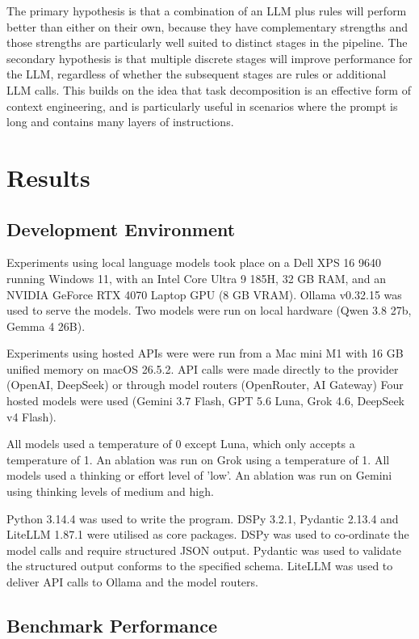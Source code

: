 \documentclass[conference]{IEEEtran}
\begin{document}
The primary hypothesis is that a combination of an LLM
plus rules will perform better than either on their own, 
because they have complementary strengths and those 
strengths are particularly well suited to distinct stages in
the pipeline. The secondary hypothesis is that multiple 
discrete stages will improve performance for the LLM,
regardless of whether the subsequent stages are rules or 
additional LLM calls. This builds on the idea that task 
decomposition is an effective form of context engineering, 
and is particularly useful in scenarios where the prompt 
is long and contains many layers of instructions. 

\section{Results}
\subsection{Development Environment}

Experiments using local language models took place on a 
Dell XPS 16 9640 running Windows 11, with an Intel Core 
Ultra 9 185H, 32 GB RAM, and an NVIDIA GeForce RTX 
4070 Laptop GPU (8 GB VRAM). Ollama v0.32.15 was 
used to serve the models. Two models were run on local 
hardware (Qwen 3.8 27b, Gemma 4 26B). 

Experiments using hosted APIs were were run from a Mac 
mini M1 with 16 GB unified memory on macOS 26.5.2. API
calls were made directly to the provider (OpenAI, DeepSeek) 
or through model routers (OpenRouter, AI Gateway) Four 
hosted models were used (Gemini 3.7 Flash, GPT 5.6 Luna, 
Grok 4.6, DeepSeek v4 Flash). 

All models used a temperature of 0 except Luna, which only 
accepts a temperature of 1. An ablation was run on Grok 
using a temperature of 1. All models used a thinking or effort 
level of 'low'. An ablation was run on Gemini using thinking
levels of medium and high. 

Python 3.14.4 was used to write the program. DSPy 3.2.1, 
Pydantic 2.13.4 and LiteLLM 1.87.1 were utilised as core
packages. DSPy was used to co-ordinate the model calls
and require structured JSON output. Pydantic was used
to validate the structured output conforms to the specified
schema. LiteLLM was used to deliver API calls to Ollama 
and the model routers.

\subsection{Benchmark Performance}
\end{document}
